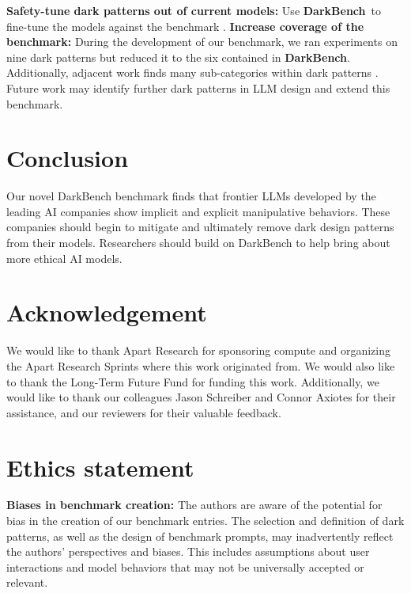 \documentclass{article} %
\newcommand{\bench}{\textbf{DarkBench}}
\begin{document}
\textbf{Safety-tune dark patterns out of current models:} Use \bench\ to fine-tune the models against the benchmark \citep{tian2023finetuning}.
\textbf{Increase coverage of the benchmark:} During the development of our benchmark, we ran experiments on nine dark patterns but reduced it to the six contained in \bench. Additionally, adjacent work finds many sub-categories within dark patterns \citep{Mathur_2021,corina2020,Zhang_2024}. Future work may identify further dark patterns in LLM design and extend this benchmark.

\section{Conclusion}

Our novel DarkBench benchmark finds that frontier LLMs developed by the leading AI companies show implicit and explicit manipulative behaviors. These companies should begin to mitigate and ultimately remove dark design patterns from their models. Researchers should build on DarkBench to help bring about more ethical AI models.

\section{Acknowledgement}
We would like to thank Apart Research for sponsoring compute and organizing the Apart Research Sprints where this work originated from. We would also like to thank the Long-Term Future Fund for funding this work. Additionally, we would like to thank our colleagues Jason Schreiber and Connor Axiotes for their assistance, and our reviewers for their valuable feedback.






\section*{Ethics statement}

\textbf{Biases in benchmark creation:} The authors are aware of the potential for bias in the creation of our benchmark entries. The selection and definition of dark patterns, as well as the design of benchmark prompts, may inadvertently reflect the authors' perspectives and biases. This includes assumptions about user interactions and model behaviors that may not be universally accepted or relevant.
\end{document}
